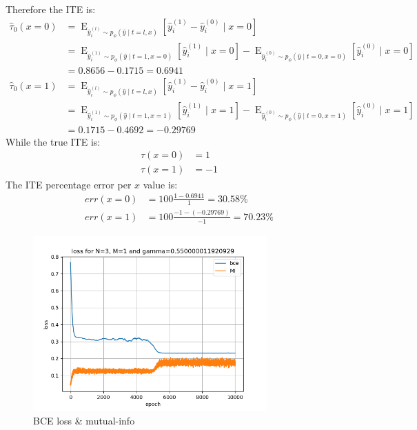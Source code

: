 \documentclass[oneside,12pt]{article}
\begin{document}
%
Therefore the ITE is:
%
\begin{equation}
    \begin{split}
        \hat{\tau}_0(x=0) &= \operatorname{E}_{\hat{y}_i^{(l)} \sim p_\phi(\hat{y} \mid t=l,x)}\left[\hat{y}_i^{(1)}-\hat{y}_i^{(0)} \mid x=0 \right]\\
        &= \operatorname{E}_{\hat{y}_i^{(1)} \sim p_\phi(\hat{y} \mid t=1,x=0)}\left[\hat{y}_i^{(1)} \mid x=0 \right] - \operatorname{E}_{\hat{y}_i^{(0)} \sim p_\phi(\hat{y} \mid t=0,x=0)}\left[\hat{y}_i^{(0)} \mid x=0 \right]\\
        &= 0.8656 - 0.1715 = 0.6941\\
        \hat{\tau}_0(x=1) &= \operatorname{E}_{\hat{y}_i^{(l)} \sim p_\phi(\hat{y} \mid t=l,x)}\left[\hat{y}_i^{(1)}-\hat{y}_i^{(0)} \mid x=1 \right]\\
        &= \operatorname{E}_{\hat{y}_i^{(1)} \sim p_\phi(\hat{y} \mid t=1,x=1)}\left[\hat{y}_i^{(1)} \mid x=1 \right] - \operatorname{E}_{\hat{y}_i^{(0)} \sim p_\phi(\hat{y} \mid t=0,x=1)}\left[\hat{y}_i^{(0)} \mid x=1 \right]\\
        &= 0.1715 - 0.4692 = -0.29769    
    \end{split}
\end{equation}
%
While the true ITE is:
\begin{equation}
    \begin{split}
        \tau(x=0) &= 1\\
        \tau(x=1) &= -1
    \end{split}
\end{equation}
%
The ITE percentage error per $x$ value is:
%
\begin{equation}
    \begin{split}
        err(x=0) &= 100\frac{1-0.6941}{1} = 30.58 \%\\
        err(x=1) &= 100\frac{-1-(-0.29769)}{-1} = 70.23\%
    \end{split}
\end{equation}
%
%
\begin{figure}
    \centering
        \includegraphics[width=0.8\textwidth]{./mutualInfoHist_gamma_055}
        \caption{\label{fig:mutualInfoHist_gamma_055}BCE loss \& mutual-info}
\end{figure}
\end{document}
